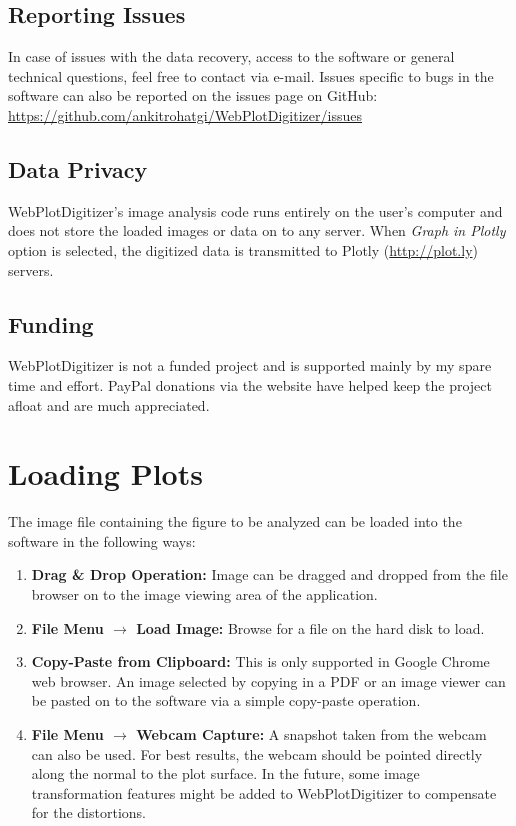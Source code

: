 \documentclass[letterpaper, 10pt]{article}
\begin{document}
\subsection{Reporting Issues}
In case of issues with the data recovery, access to the software or general technical questions, feel free to contact via e-mail. Issues specific to bugs in the software can also be reported on the issues page on GitHub: \url{https://github.com/ankitrohatgi/WebPlotDigitizer/issues}

\subsection{Data Privacy}
WebPlotDigitizer's image analysis code runs entirely on the user's computer and does not store the loaded images or data on to any server. When \emph{Graph in Plotly} option is selected, the digitized data is transmitted to Plotly (\url{http://plot.ly}) servers.

\subsection{Funding}
WebPlotDigitizer is not a funded project and is supported mainly by my spare time and effort. PayPal donations via the website have helped keep the project afloat and are  much appreciated.

\section{Loading Plots}
The image file containing the figure to be analyzed can be loaded into the software in the following ways:
\begin{enumerate}
\item{{\bf Drag \& Drop Operation:} Image can be dragged and dropped from the file browser on to the image viewing area of the application.}
\item{{\bf File Menu $\rightarrow$ Load Image:} Browse for a file on the hard disk to load.}
\item{{\bf Copy-Paste from Clipboard:} This is only supported in Google Chrome web browser. An image selected by copying in a PDF or an image viewer can be pasted on to the software via a simple copy-paste operation.}
\item{{\bf File Menu $\rightarrow$ Webcam Capture:} A snapshot taken from the webcam can also be used. For best results, the webcam should be pointed directly along the normal to the plot surface. In the future, some image transformation features might be added to WebPlotDigitizer to compensate for the distortions.}  
\end{enumerate}
\end{document}
